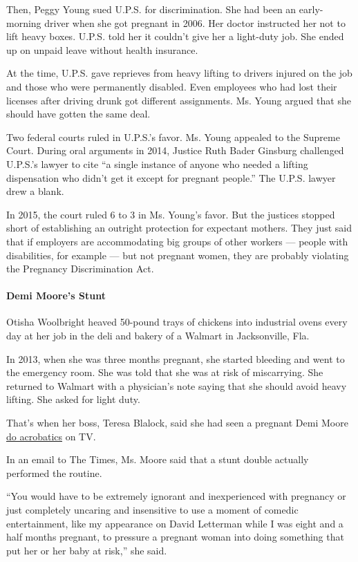 Then, Peggy Young sued U.P.S. for discrimination. She had been an
early-morning driver when she got pregnant in 2006. Her doctor
instructed her not to lift heavy boxes. U.P.S. told her it couldn't give
her a light-duty job. She ended up on unpaid leave without health
insurance.

At the time, U.P.S. gave reprieves from heavy lifting to drivers injured
on the job and those who were permanently disabled. Even employees who
had lost their licenses after driving drunk got different assignments.
Ms. Young argued that she should have gotten the same deal.

Two federal courts ruled in U.P.S.'s favor. Ms. Young appealed to the
Supreme Court. During oral arguments in 2014, Justice Ruth Bader
Ginsburg challenged U.P.S.'s lawyer to cite ``a single instance of
anyone who needed a lifting dispensation who didn't get it except for
pregnant people.'' The U.P.S. lawyer drew a blank.

In 2015, the court ruled 6 to 3 in Ms. Young's favor. But the justices
stopped short of establishing an outright protection for expectant
mothers. They just said that if employers are accommodating big groups
of other workers --- people with disabilities, for example --- but not
pregnant women, they are probably violating the Pregnancy Discrimination
Act.

\hypertarget{demi-moores-stunt}{%
\paragraph{Demi Moore's Stunt}\label{demi-moores-stunt}}

Otisha Woolbright heaved 50-pound trays of chickens into industrial
ovens every day at her job in the deli and bakery of a Walmart in
Jacksonville, Fla.

In 2013, when she was three months pregnant, she started bleeding and
went to the emergency room. She was told that she was at risk of
miscarrying. She returned to Walmart with a physician's note saying that
she should avoid heavy lifting. She asked for light duty.

That's when her boss, Teresa Blalock, said she had seen a pregnant Demi
Moore \href{https://www.youtube.com/watch?v=OQX50pPWDyA}{do acrobatics}
on TV.

In an email to The Times, Ms. Moore said that a stunt double actually
performed the routine.

``You would have to be extremely ignorant and inexperienced with
pregnancy or just completely uncaring and insensitive to use a moment of
comedic entertainment, like my appearance on David Letterman while I was
eight and a half months pregnant, to pressure a pregnant woman into
doing something that put her or her baby at risk,'' she said.

